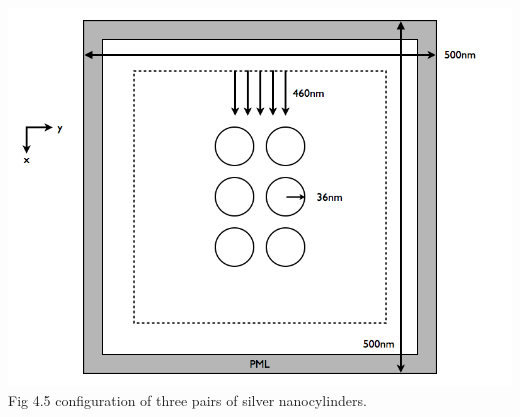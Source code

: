 \documentclass[openany]{book}
\begin{document}
\begin{center}
\includegraphics[scale=0.5]{images/open-cavity-config.jpg}\\
Fig 4.5
configuration of three pairs of silver nanocylinders.
\end{center}
\end{document}
